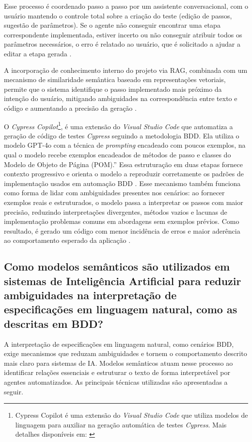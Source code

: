 Esse processo é coordenado passo a passo por um assistente conversacional, com o usuário mantendo o controle total sobre a criação do teste (edição de passos, sugestão de parâmetros). Se o agente não conseguir encontrar uma etapa correspondente implementada, estiver incerto ou não conseguir atribuir todos os parâmetros necessários, o erro é relatado ao usuário, que é solicitado a ajudar a editar a etapa gerada \cite{Paduraru2025}.

A incorporação de conhecimento interno do projeto via RAG, combinada com um mecanismo de similaridade semântica baseado em representações vetoriais, permite que o sistema identifique o passo implementado mais próximo da intenção do usuário, mitigando ambiguidades na correspondência entre texto e código e aumentando a precisão da geração \cite{Paduraru2025}.

O \textit{Cypress Copilot}\footnote{Cypress Copilot é uma extensão do \textit{Visual Studio Code} que utiliza modelos de linguagem para auxiliar na geração automática de testes \textit{Cypress}. Mais detalhes disponíveis em: \cite{cypresscopilot}}, é uma extensão do \textit{Visual Studio Code} que automatiza a geração de código de testes \textit{Cypress} seguindo a metodologia BDD. Ela utiliza o modelo GPT-4o com a técnica de \textit{prompting} encadeado com poucos exemplos, na qual o modelo recebe exemplos encadeados de métodos de passo e classes do Modelo de Objeto de Página (POM).” Essa estruturação em duas etapas fornece contexto progressivo e orienta o modelo a reproduzir corretamente os padrões de implementação usados em automação BDD \cite{Nettur2025}. Esse mecanismo também funciona como forma de lidar com ambiguidades presentes nos cenários: ao fornecer exemplos reais e estruturados, o modelo passa a interpretar os passos com maior precisão, reduzindo interpretações divergentes, métodos vazios e lacunas de implementação problemas comuns em abordagens sem exemplos prévios. Como resultado, é gerado um código com menor incidência de erros e maior aderência ao comportamento esperado da aplicação \cite{Nettur2025}.

\subsection{Como modelos semânticos são utilizados em sistemas de Inteligência Artificial para reduzir ambiguidades na interpretação de especificações em linguagem natural, como as descritas em BDD?}

A interpretação de especificações em linguagem natural, como cenários BDD, exige mecanismos que reduzam ambiguidades e tornem o comportamento descrito mais claro para sistemas de IA. Modelos semânticos atuam nesse processo ao identificar relações essenciais e estruturar o texto de forma interpretável por agentes automatizados. As principais técnicas utilizadas são apresentadas a seguir.


